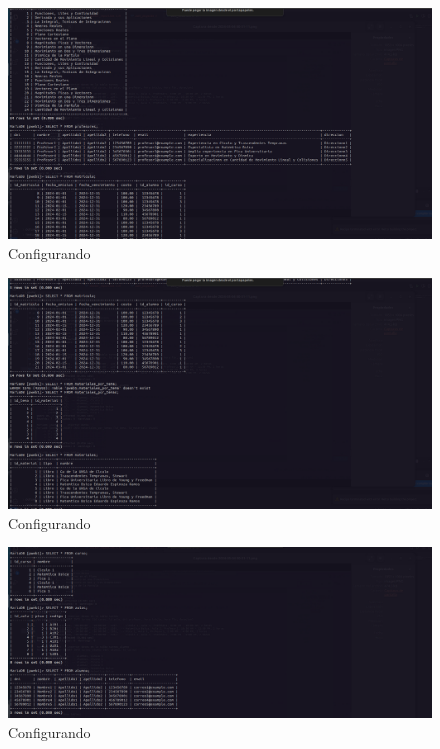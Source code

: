\begin{figure}[H]
  \centering
  \includegraphics[width=1.0\textwidth]{img/Viendo_Datos_3.png}
  \caption{Configurando}
\end{figure}
\begin{figure}[H]
  \centering
  \includegraphics[width=1.0\textwidth]{img/Viendo_Datos_2.png}
  \caption{Configurando}
\end{figure}
\begin{figure}[H]
  \centering
  \includegraphics[width=1.0\textwidth]{img/Viendo_Datos_1.png}
  \caption{Configurando}
\end{figure}

